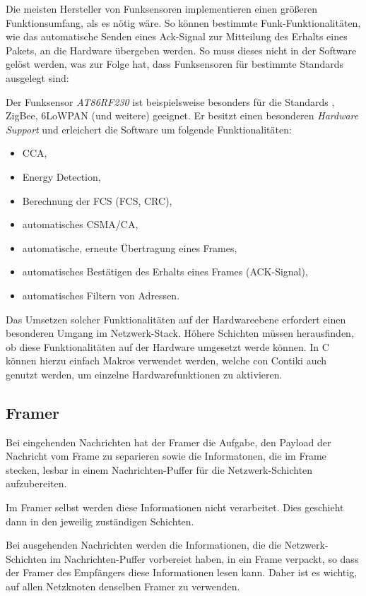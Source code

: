 	Die meisten Hersteller von Funksensoren implementieren einen größeren
	Funktionsumfang, als es nötig wäre. So können bestimmte
	Funk-Funktionalitäten, wie das automatische Senden eines Ack-Signal zur
	Mitteilung des Erhalts eines Pakets, an die Hardware übergeben werden.
	So muss dieses nicht in der Software gelöst werden, was zur Folge hat,
	dass Funksensoren \iA für bestimmte Standards ausgelegt sind:

	Der Funksensor \emph{AT86RF230} ist beispielsweise besonders für die
	Standards \ieeeframe, ZigBee, 6LoWPAN (und weitere) geeignet.  Er
	besitzt einen besonderen \emph{ Hardware Support} und
	erleichert die Software um folgende Funktionalitäten:

	\begin{itemize}
	\item 	\acf{CCA},
	\item 	Energy Detection,
	\item 	Berechnung der \acl{FCS} (\acs{FCS}, \acs{CRC}),
	\item 	automatisches \acs{CSMA/CA},
	\item 	automatische, erneute Übertragung eines Frames,
	\item 	automatisches Bestätigen des Erhalts eines Frames (ACK-Signal),
	\item 	automatisches Filtern von Adressen.
	\end{itemize}

	Das Umsetzen solcher Funktionalitäten auf der Hardwareebene erfordert
	einen besonderen Umgang im Netzwerk-Stack.  Höhere Schichten müssen
	herausfinden, ob diese Funktionalitäten auf der Hardware umgesetzt
	werde können.  In C können hierzu einfach Makros verwendet werden,
	welche con Contiki auch genutzt werden, um einzelne Hardwarefunktionen
	zu aktivieren.

\subsection{Framer}

	Bei eingehenden Nachrichten hat der Framer die Aufgabe, den Payload der
	Nachricht vom Frame zu separieren sowie die Informatonen, die im Frame
	stecken, lesbar in einem Nachrichten-Puffer für die Netzwerk-Schichten
	aufzubereiten.

	Im Framer selbst werden diese Informationen nicht verarbeitet.  Dies
	geschieht dann in den jeweilig zuständigen Schichten.

	Bei ausgehenden Nachrichten werden die Informationen, die die
	Netzwerk-Schichten im Nachrichten-Puffer vorbereiet haben, in ein Frame
	verpackt, so dass der Framer des Empfängers diese Informationen lesen
	kann.  Daher ist es wichtig, auf allen Netzknoten denselben Framer zu
	verwenden.

